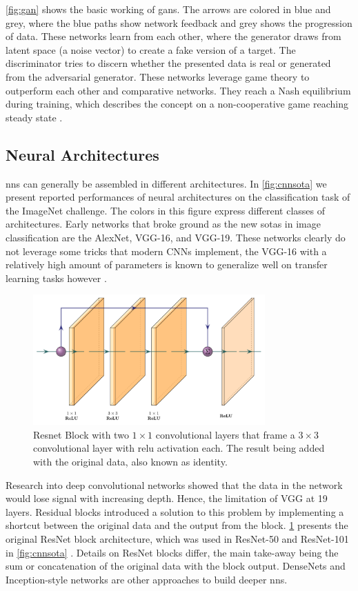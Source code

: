 \cref{fig:gan} shows the basic working of \acp{gan}. The arrows are colored in blue and grey, where the blue paths show network feedback and grey shows the progression of data. These networks learn from each other, where the generator draws from latent space (a noise vector) to create a fake version of a target. The discriminator tries to discern whether the presented data is real or generated from the adversarial generator. These networks leverage game theory to outperform each other and comparative networks. They reach a Nash equilibrium during training, which describes the concept on a non-cooperative game reaching steady state \citep{nash1951non}. 

\subsection{Neural Architectures}
\aclp{nn} can generally be assembled in different architectures. In \cref{fig:cnnsota} we present reported performances of neural architectures on the classification task of the ImageNet challenge. The colors in this figure express different classes of architectures. Early networks that broke ground as the new \aclp{sota} in image classification are the AlexNet, VGG-16, and VGG-19. These networks clearly do not leverage some tricks that modern CNNs implement, the VGG-16 with a relatively high amount of parameters is known to generalize well on transfer learning tasks however \citep{dramsch2018deep}. 

\begin{figure}[H]
    \centering
    \includegraphics[width=\textwidth,height=5cm,keepaspectratio]{figures/resnet.pdf}
    \caption{Resnet Block with two $1\times1$ convolutional layers that frame a $3\times3$ convolutional layer with \ac{relu} activation each. The result being added with the original data, also known as identity.}
    \label{fig:resnet}
\end{figure}

Research into deep convolutional networks showed that the data in the network would lose signal with increasing depth. Hence, the limitation of VGG at 19 layers. Residual blocks introduced a solution to this problem by implementing a shortcut between the original data and the output from the block. \cref{fig:resnet} presents the original ResNet block architecture, which was used in ResNet-50 and ResNet-101 in \cref{fig:cnnsota} \citep{he2016deep}. Details on ResNet blocks differ, the main take-away being the sum or concatenation of the original data with the block output. DenseNets \citep{huang2017densely} and Inception-style networks \citep{szegedy2015going} are other approaches to build deeper \acp{nn}.

